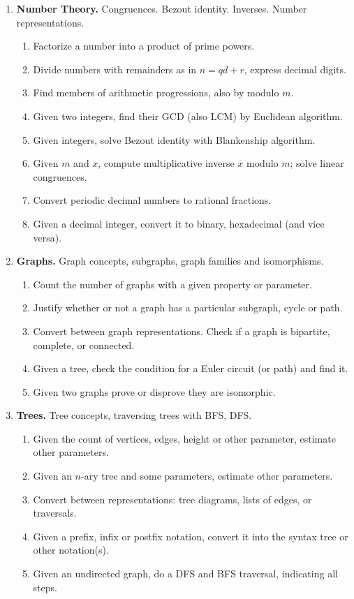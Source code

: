 \documentclass[a4paper,12pt]{article}
\begin{document}
{\small
\begin{enumerate}

\item \textbf{Number Theory.} Congruences. Bezout identity. Inverses. Number representations.
\begin{enumerate}
\item Factorize a number into a product of prime powers.
\item Divide numbers with remainders as in $n = qd + r$, express decimal digits.
\item Find members of arithmetic progressions, also by modulo $m$.
\item Given two integers, find their GCD (also LCM) by Euclidean algorithm.
\item Given integers, solve Bezout identity with Blankenship algorithm.
\item Given $m$ and $x$, compute
multiplicative inverse $\overline{x}$ modulo $m$; solve linear congruences.
\item Convert periodic decimal numbers to rational fractions.
\item Given a decimal integer, convert it to binary, hexadecimal (and vice versa).
\end{enumerate}

\item \textbf{Graphs.} Graph concepts, subgraphs, graph families and isomorphisms.
\begin{enumerate}
\item Count the number of graphs with a given property or parameter.
\item Justify whether or not a graph has a particular subgraph, cycle or path.
\item Convert between graph representations.
Check if a graph is bipartite, complete, or connected.
\item Given a tree, check the condition for a Euler circuit (or path) and find it.
\item Given two graphs prove or disprove they are isomorphic.
\end{enumerate}

\item \textbf{Trees.} Tree concepts, traversing trees with BFS, DFS.
\begin{enumerate}
\item Given the count of vertices, edges, height or other parameter, estimate other parameters.
\item Given an $n$-ary tree and some parameters, estimate other parameters.
\item Convert between representations: tree diagrams, lists of edges, or traversals.
\item Given a prefix, infix or postfix notation, convert it into the syntax tree or other notation(s).
\item Given an undirected graph, do a DFS and BFS traversal, indicating all steps.
\end{enumerate}
\end{enumerate}
}
\end{document}
